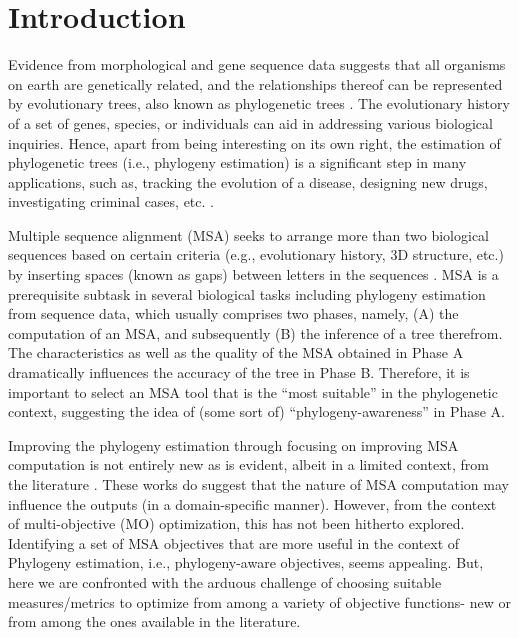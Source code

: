 \chapter{Introduction}
\label{ch:introduction}

Evidence from morphological and gene sequence data suggests that all organisms on earth are genetically related, and the relationships thereof can be represented by evolutionary trees, also known as phylogenetic trees \cite{warnow2017computational}. The evolutionary history of a set of genes, species, or individuals can aid in addressing various biological inquiries. Hence, apart from being interesting on its own right, the estimation of phylogenetic trees (i.e., phylogeny estimation) is a significant step in many applications, such as, tracking the evolution of a disease, designing new drugs, investigating criminal cases, etc. \cite{bush1999predicting, aluru2005handbook}. 

Multiple sequence alignment (MSA) seeks to arrange more than two biological sequences based on certain criteria (e.g., evolutionary history, 3D structure, etc.) by inserting spaces (known as gaps) between letters in the sequences \cite{warnow2017computational}. MSA is a prerequisite subtask in several biological tasks including phylogeny estimation from sequence data, which usually comprises two phases, namely, (A) the computation of an MSA, and subsequently (B) the inference of a tree therefrom. The characteristics as well as the quality of the MSA obtained in Phase A dramatically influences the accuracy of the tree in Phase B. Therefore, it is important to select an MSA tool that is the “most suitable” in the phylogenetic context, suggesting the idea of (some sort of) “phylogeny-awareness” in Phase A. 

Improving the phylogeny estimation through focusing on improving MSA computation is not entirely new as is evident, albeit in a limited context, from the literature \cite{redelings2005joint, ashkenazy2018multiple, warnow2013large}. These works do suggest that the nature of MSA computation may influence the outputs (in a domain-specific manner). However, from the context of multi-objective (MO) optimization, this has not been hitherto explored. Identifying a set of MSA objectives that are more useful in the context of Phylogeny estimation, i.e., phylogeny-aware objectives, seems appealing. But, here we are confronted with the arduous challenge of choosing suitable measures/metrics to optimize from among a variety of objective functions- new or from among the ones available in the literature. 


